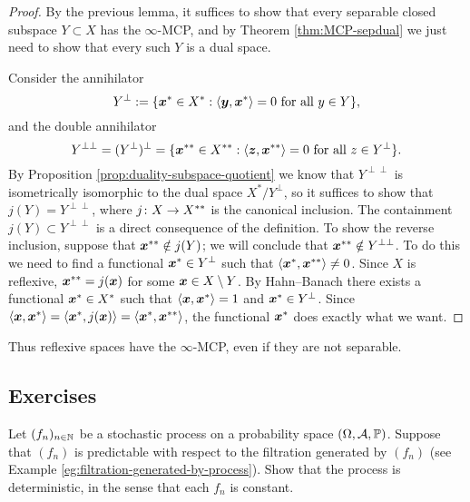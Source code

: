\begin{proof}
  By the previous lemma, it suffices to show that every separable closed subspace $Y \subset X$ has the $\infty$-MCP, and by Theorem \ref{thm:MCP-sepdual} we just need to show that every such $Y$ is a dual space.
  
  Consider the annihilator
  \begin{equation*}
    Y^{\perp} := \{\bm{x}^* \in X^* :  \text{$\langle \bm{y}, \bm{x}^* \rangle = 0$ for all $y \in Y$}\},
  \end{equation*}
  and the double annihilator
  \begin{equation*}
    Y^{\perp\perp} = (Y^\perp)^\perp = \{\bm{x}^{**} \in X^{**} : \text{$\langle \bm{z}, \bm{x}^{**} \rangle = 0$ for all $z \in Y^\perp$}\}.
  \end{equation*}
  By Proposition \ref{prop:duality-subspace-quotient} we know that $Y^{\perp\perp}$ is isometrically isomorphic to the dual space $X^*/Y^\perp$, so it suffices to show that $j(Y) = Y^{\perp\perp}$, where $j \colon X \rightarrow X^{**}$ is the canonical inclusion.
  The containment $j(Y) \subset Y^{\perp\perp}$ is a direct consequence of the definition.
  To show the reverse inclusion, suppose that $\bm{x}^{**} \notin j(Y)$; we will conclude that $\bm{x}^{**} \notin Y^{\perp\perp}$.
  To do this we need to find a functional $\bm{x}^* \in Y^{\perp}$ such that $\langle\bm{x}^*, \bm{x}^{**}\rangle \neq 0$.
  Since $X$ is reflexive, $\bm{x}^{**} = j(\bm{x})$ for some $\bm{x} \in X \setminus Y$.
  By Hahn--Banach there exists a functional $\bm{x}^* \in X^*$ such that $\langle \bm{x}, \bm{x}^* \rangle = 1$ and $\bm{x}^* \in Y^\perp$.
  Since $\langle \bm{x}, \bm{x}^* \rangle = \langle \bm{x}^*, j(\bm{x}) \rangle = \langle \bm{x}^*, \bm{x}^{**} \rangle$, the functional $\bm{x}^*$ does exactly what we want.
\end{proof}

Thus reflexive spaces have the $\infty$-MCP, even if they are not separable.


\subsection*{Exercises}

\begin{exercise}
  Let $(f_n)_{n \in \mathbb{N}}$ be a stochastic process on a probability space $(\Omega,\mathcal{A},\mathbb{P})$.
  Suppose that $(f_n)$ is predictable with respect to the filtration generated by $(f_n)$ (see Example \ref{eg:filtration-generated-by-process}).
  Show that the process is deterministic, in the sense that each $f_n$ is constant.
\end{exercise}

